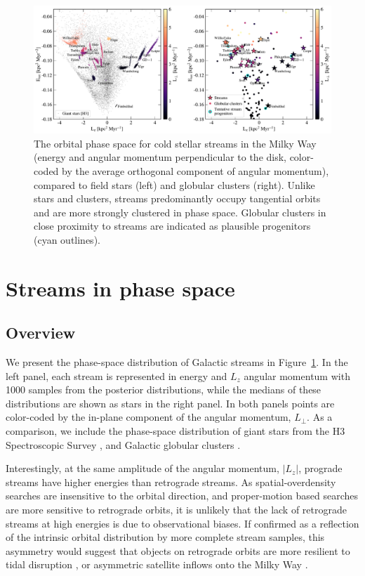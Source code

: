 \documentclass[twocolumn]{aastex63}
\begin{document}
\begin{figure}
\begin{center}
\includegraphics[width=\textwidth]{elz_streams.pdf}
\end{center}
\caption{The orbital phase space for cold stellar streams in the Milky Way (energy and angular momentum perpendicular to the disk, color-coded by the average orthogonal component of angular momentum), compared to field stars (left) and globular clusters (right).
Unlike stars and clusters, streams predominantly occupy tangential orbits and are more strongly clustered in phase space.
Globular clusters in close proximity to streams are indicated as plausible progenitors (cyan outlines).
}
\label{fig:elz}
\end{figure}

\section{Streams in phase space}
\label{sec:phasespace}

\subsection{Overview}
\label{sec:elz}

We present the phase-space distribution of Galactic streams in Figure~\ref{fig:elz}.
In the left panel, each stream is represented in energy and $L_z$ angular momentum with 1000 samples from the posterior distributions, while the medians of these distributions are shown as stars in the right panel.
In both panels points are color-coded by the in-plane component of the angular momentum, $L_\perp$.
As a comparison, we include the phase-space distribution of giant stars from the H3 Spectroscopic Survey \citep[left panel, small black points;][]{conroy2019}, and Galactic globular clusters \citep[righ panel, small circles colored by $L_\perp$;][]{baumgardt2019}.

Interestingly, at the same amplitude of the angular momentum, $|L_z|$, prograde streams have higher energies than retrograde streams.
As spatial-overdensity searches are insensitive to the orbital direction, and proper-motion based searches are more sensitive to retrograde orbits, it is unlikely that the lack of retrograde streams at high energies is due to observational biases.
If confirmed as a reflection of the intrinsic orbital distribution by more complete stream samples, this asymmetry would suggest that objects on retrograde orbits are more resilient to tidal disruption \citep[e.g.,][]{velazquez1999}, or asymmetric satellite inflows onto the Milky Way \citep[e.g.,][]{herbert-fort2008}.
\end{document}
